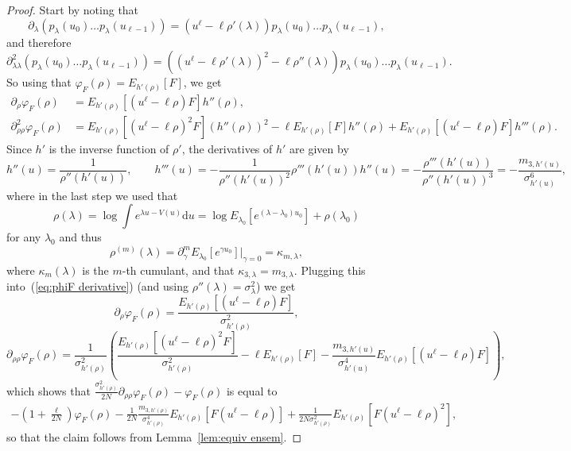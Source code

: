 \documentclass[11pt, a4paper]{article}
\newcommand{\mathd}{\mathrm{d}}
\newcommand{\1}{\mathbf{1}}
\begin{document}
\begin{proof}
  Start by noting that
  \[ \partial_{\lambda} (p_{\lambda} (u_0) \ldots p_{\lambda} (u_{\ell - 1}))
     = (u^{\ell} - \ell \rho' (\lambda)) p_{\lambda} (u_0) \ldots p_{\lambda}
     (u_{\ell - 1}), \]
  and therefore
  \[ \partial^2_{\lambda \lambda} (p_{\lambda} (u_0) \ldots p_{\lambda}
     (u_{\ell - 1})) = ((u^{\ell} - \ell \rho' (\lambda))^2 - \ell \rho''
     (\lambda)) p_{\lambda} (u_0) \ldots p_{\lambda} (u_{\ell - 1}) . \]
  So using that $\varphi_F (\rho) = E_{h' (\rho)} [F]$, we get
  \begin{align} \label{eq:phiF derivative} \nonumber
     \partial_{\rho} \varphi_F (\rho) & = E_{h' (\rho)} [(u^{\ell} - \ell \rho) F] h'' (\rho), \\
 \partial^2_{\rho \rho} \varphi_F (\rho) & = E_{h' (\rho)} [(u^{\ell} - \ell \rho)^2 F] (h'' (\rho))^2 - \ell E_{h' (\rho)} [F] h'' (\rho) + E_{h' (\rho)} [(u^{\ell} - \ell \rho) F] h''' (\rho) .
  \end{align}
  Since $h'$ is the inverse function of $\rho'$, the derivatives of $h'$ are
  given by
  \[ h'' (u) = \frac{1}{\rho'' (h' (u))}, \hspace{2em} h''' (u) = -
     \frac{1}{\rho'' (h' (u))^2} \rho''' (h' (u)) h'' (u) = - \frac{\rho'''
     (h' (u))}{\rho'' (h' (u))^3} = - \frac{m_{3, h' (u)}}{\sigma_{h' (u)}^6},
  \]
  where in the last step we used that
  \[ \rho (\lambda) = \log \int e^{\lambda u - V (u)} \mathd u =
     \log E_{\lambda_0} [e^{(\lambda - \lambda_0) u_0}] + \rho (\lambda_0)
  \]
  for any $\lambda_0$ and thus
  \[ \rho^{(m)} (\lambda) = \partial^m_{\gamma} E_{\lambda_0} [e^{\gamma u_0}]
     |_{\gamma = 0} = \kappa_{m, \lambda}, \]
  where $\kappa_m (\lambda)$ is the $m$-th cumulant, and that $\kappa_{3,
  \lambda} = m_{3, \lambda}$. Plugging this into~(\ref{eq:phiF derivative})
  (and using $\rho'' (\lambda) = \sigma_{\lambda}^2$) we get
  \[ \partial_{\rho} \varphi_F (\rho) = \frac{E_{h' (\rho)} [(u^{\ell} - \ell
     \rho) F]}{\sigma_{h' (\rho)}^2}, \]
  \[ \partial_{\rho \rho} \varphi_F (\rho) = \frac{1}{\sigma_{h' (\rho)}^2}
     \left( \frac{E_{h' (\rho)} [(u^{\ell} - \ell \rho)^2 F]}{\sigma^2_{h'
     (\rho)}} - \ell E_{h' (\rho)} [F] - \frac{m_{3, h' (u)}}{\sigma_{h'
     (u)}^4} E_{h' (\rho)} [(u^{\ell} - \ell \rho) F] \right), \]
  which shows that
   $\frac{\sigma_{h' (\rho)}^2}{2 N} \partial_{\rho \rho} \varphi_F (\rho) - \varphi_F (\rho)$ is equal to
  \begin{align*}
   - \left( 1 + \frac{\ell}{2 N} \right) \varphi_F (\rho) - \frac{1}{2 N}
   \frac{m_{3, h' (\rho)}}{\sigma^4_{h' (\rho)}} E_{h' (\rho)} [F (u^{\ell}
   - \ell \rho)] + \frac{1}{2 N \sigma_{h' (\rho)}^2} E_{h' (\rho)} [F
   (u^{\ell} - \ell \rho)^2],
  \end{align*}
  so that the claim follows from Lemma~\ref{lem:equiv ensem}.
\end{proof}
\end{document}
